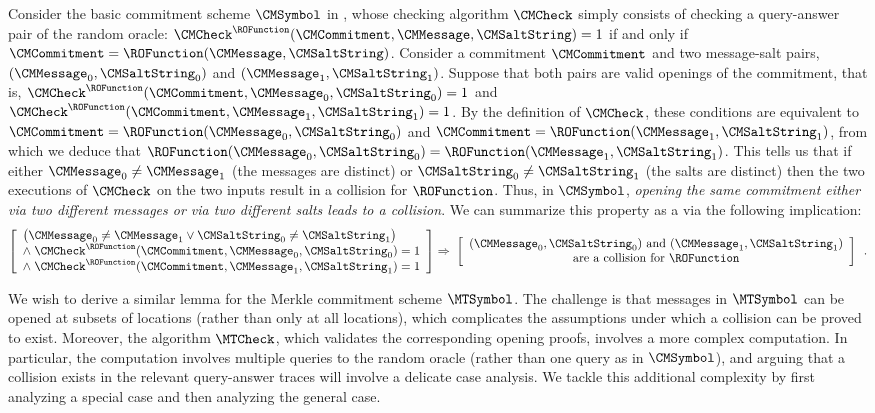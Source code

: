 Consider the basic commitment scheme $\CMSymbol$ in , whose checking algorithm $\CMCheck$ simply consists of checking a query-answer pair of the random oracle: $\CMCheck^{\ROFunction}(\CMCommitment,\CMMessage,\CMSaltString)=1$ if and only if $\CMCommitment = \ROFunction(\CMMessage,\CMSaltString)$. Consider a commitment $\CMCommitment$ and two message-salt pairs, $(\CMMessage_{0},\CMSaltString_{0})$ and $(\CMMessage_{1},\CMSaltString_{1})$. Suppose that both pairs are valid openings of the commitment, that is, $\CMCheck^{\ROFunction}(\CMCommitment,\CMMessage_{0},\CMSaltString_{0})=1$ and $\CMCheck^{\ROFunction}(\CMCommitment,\CMMessage_{1},\CMSaltString_{1})=1$. By the definition of $\CMCheck$, these conditions are equivalent to $\CMCommitment = \ROFunction(\CMMessage_{0},\CMSaltString_{0})$ and $\CMCommitment = \ROFunction(\CMMessage_{1},\CMSaltString_{1})$, from which we deduce that $\ROFunction(\CMMessage_{0},\CMSaltString_{0})=\ROFunction(\CMMessage_{1},\CMSaltString_{1})$. This tells us that if either $\CMMessage_{0} \neq \CMMessage_{1}$ (the messages are distinct) or $\CMSaltString_{0} \neq \CMSaltString_{1}$ (the salts are distinct) then the two executions of $\CMCheck$ on the two inputs result in a collision for $\ROFunction$. Thus, in $\CMSymbol$, \emph{opening the same commitment either via two different messages or via two different salts leads to a collision}. We can summarize this property as a  via the following implication:
\begin{equation*}
\left[
\begin{array}{l}
\big(
\CMMessage_{0} \neq \CMMessage_{1}
\lor
\CMSaltString_{0} \neq \CMSaltString_{1}
\big) \\
\land \;\CMCheck^{\ROFunction}(\CMCommitment,\CMMessage_{0},\CMSaltString_{0})=1 \\
\land \;\CMCheck^{\ROFunction}(\CMCommitment,\CMMessage_{1},\CMSaltString_{1})=1
\end{array}
\right]
\Rightarrow\;
\left[
\begin{array}{c}
\text{$(\CMMessage_{0},\CMSaltString_{0})$ and $(\CMMessage_{1},\CMSaltString_{1})$} \\
\text{are a collision for $\ROFunction$}
\end{array}
\right]
\enspace.
\end{equation*}

We wish to derive a similar lemma for the Merkle commitment scheme $\MTSymbol$. The challenge is that messages in $\MTSymbol$ can be opened at subsets of locations (rather than only at all locations), which complicates the assumptions under which a collision can be proved to exist. Moreover, the algorithm $\MTCheck$, which validates the corresponding opening proofs, involves a more complex computation. In particular, the computation involves multiple queries to the random oracle (rather than one query as in $\CMSymbol$), and arguing that a collision exists in the relevant query-answer traces will involve a delicate case analysis. We tackle this additional complexity by first analyzing a special case and then analyzing the general case.

